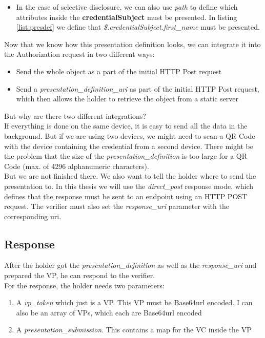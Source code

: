 \documentclass[
	a4paper               %
	,bibliography=totoc   %
	,listof=totoc         %
	,monolingual
	twoside=false,
]{bfhthesis}              %
\begin{document}
\begin{enumerate}
\begin{itemize}
\begin{itemize}
\begin{itemize}
				\item In the case of selective disclosure, we can also use \textit{path} to define which attributes inside the \textbf{credentialSubject} must be presented. In listing \ref{list:presdef} we define that \textit{\$.credentialSubject.first\_name} must be presented.
			\end{itemize}
		\end{itemize}
	\end{itemize}
\end{enumerate}

Now that we know how this presentation definition looks, we can integrate it into the Authorization request in two different ways:
\begin{itemize}
	\item Send the whole object as a part of the initial HTTP Post request
	\item Send a \textit{presentation\_definition\_uri} as part of the initial HTTP Post request, which then allows the holder to retrieve the object from a static server
\end{itemize}

But why are there two different integrations?\\
If everything is done on the same device, it is easy to send all the data in the background. But if we are using two devices, we might need to scan a QR Code with the device containing the credential from a second device. There might be the problem that the size of the \textit{presentation\_definition} is too large for a QR Code (max. of 4296 alphanumeric characters).\\

But we are not finished there. We also want to tell the holder where to send the presentation to.
In this thesis we will use the \textit{direct\_post} response mode, which defines that the response must be sent to an endpoint using an HTTP POST request. The verifier must also set the \textit{response\_uri} parameter with the corresponding uri.

\subsection{Response}
After the holder got the \textit{presentation\_definition} as well as the \textit{response\_uri} and prepared the VP, he can respond to the verifier.\\

For the response, the holder needs two parameters:
\begin{enumerate}
	\item A \textit{vp\_token} which just is a VP. This VP must be Base64url encoded. I can also be an array of VPs, which each are Base64url encoded
	\item A \textit{presentation\_submission}. This contains a map for the VC inside the VP
\end{enumerate}
\end{document}
